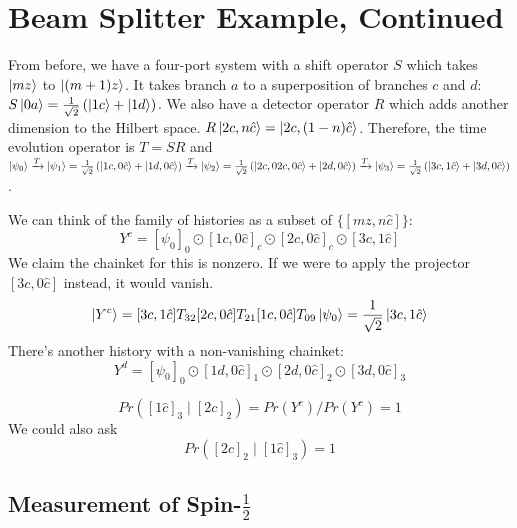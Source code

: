 \documentclass[a4paper,twoside,master.tex]{subfiles}
\begin{document}
\section{Beam Splitter Example, Continued}%
\label{sec:beam_splitter_example_continued}

From before, we have a four-port system with a shift operator $S$ which takes $\ket{mz}$ to $\ket{(m+1)z}$. It takes branch $a$ to a superposition of branches $c$ and $d$: $S\ket{0a} = \frac{1}{\sqrt{2}}\left( \ket{1c}+\ket{1d} \right) $. We also have a detector operator $R$ which adds another dimension to the Hilbert space. $R\ket{2c,n\hat{c}} = \ket{2c,(1-n)\hat{c}}$. Therefore, the time evolution operator is $T=SR$ and $\ket{\psi_0}\xrightarrow{T}\ket{\psi_1} = \frac{1}{\sqrt{2}}\left( \ket{1c,0\hat{c}}+\ket{1d,0\hat{c}} \right)\xrightarrow{T}\ket{\psi_2} = \frac{1}{\sqrt{2}}\left(\ket{ 2c,02c,0\hat{c}} + \ket{2d,0\hat{c}} \right)\xrightarrow{T}\ket{\psi_3} = \frac{1}{\sqrt{2}}\left(\ket{3c,1\hat{c}}+\ket{3d,0\hat{c}} \right)$.

We can think of the family of histories as a subset of $\{[mz,n\hat{c}]\}$:
\begin{equation}
    Y^c = [\psi_0]_0\odot[1c,0\hat{c}]_c\odot[2c,0\hat{c}]_c\odot[3c,1\hat{c}]
\end{equation}
We claim the chainket for this is nonzero. If we were to apply the projector $[3c,0\hat{c}]$ instead, it would vanish.
\begin{equation}
    \ket{Y^c} = [3c,1\hat{c}]T_{32}[2c,0\hat{c}]T_{21}[1c,0\hat{c}]T_{09}\ket{\psi_0} = \frac{1}{\sqrt{2}}\ket{3c,1\hat{c}}
\end{equation}
There's another history with a non-vanishing chainket:
\begin{equation}
    Y^d = [\psi_0]_0\odot[1d,0\hat{c}]_1\odot[2d,0\hat{c}]_2\odot[3d,0\hat{c}]_3
\end{equation}

\begin{equation}
    Pr([1\hat{c}]_3\mid[2c]_2) = Pr(Y^c) / Pr(Y^c) = 1
\end{equation}
We could also ask
\begin{equation}
    Pr([2c]_2\mid[1\hat{c}]_3) = 1
\end{equation}

\subsection{Measurement of Spin-$ \frac{1}{2}$}%
\label{sub:measurement_of_}
\end{document}
